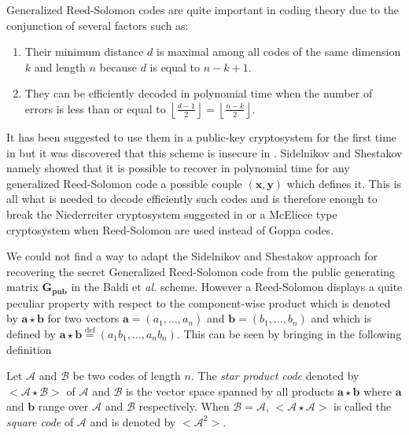 \documentclass[runningheads,11pt]{llncs}
\newcommand{\eqdef}{\stackrel{\text{def}}{=}}
\newcommand{\code}[1]{\ensuremath{\mathscr{#1}}}
\newcommand{\word}[1]{\ensuremath{\boldsymbol{#1}}}
\newcommand{\av}{\word{a}}
\newcommand{\bv}{\word{b}}
\newcommand{\xv}{\word{x}}
\newcommand{\yv}{\word{y}}
\newcommand{\mat}[1]{\ensuremath{\boldsymbol{#1}}}
\newcommand{\Gmp}{\mat{G_{pub}}}
\begin{document}
Generalized Reed-Solomon codes are quite important in coding theory
due to the conjunction of several factors such as:
\begin{enumerate}
\item Their minimum distance $d$ is maximal among all codes of the
  same dimension $k$ and length $n$  because $d$ is equal to $n-k+1$.
\item They can be efficiently decoded in polynomial time when the number of errors
is less than or equal to $\displaystyle \left \lfloor \frac{d-1}{2}
  \right \rfloor = \left \lfloor \frac{n-k}{2} \right \rfloor$. 
\end{enumerate}
It has been suggested to use them in a public-key cryptosystem for the first time in \cite{Niederreiter86} but 
it was discovered that this scheme is insecure in \cite{SidelShesta92}. Sidelnikov and Shestakov namely showed that it is 
possible  
to recover in polynomial time for any generalized Reed-Solomon code a possible couple $(\xv,\yv)$ which defines it.
This is all what is needed to decode efficiently such codes and is therefore enough to break the Niederreiter cryptosystem suggested in 
\cite{Niederreiter86} or a McEliece type cryptosystem \cite{McEliece78} when Reed-Solomon are used instead of Goppa codes.

We could not find a way to adapt the Sidelnikov and Shestakov approach 
for recovering the secret Generalized Reed-Solomon code from the public generating matrix $\Gmp$ in the 
Baldi et \textit{al.} scheme. 
However a Reed-Solomon displays a quite peculiar property with respect to the component-wise
product which is denoted by  $\av \star \bv $ for two vectors 
 $\av=(a_1, \dots, a_n)$ and $\bv=(b_1, \dots, b_n)$ and which is defined by
 $\av \star \bv \eqdef (a_1b_1,\dots{},a_n b_n)$. This can be seen by bringing in the following definition


\begin{definition}
Let $\code{A}$ and $\code{B}$ be two codes of length $n$. The
\emph{star product code} denoted by $<\code{A} \star \code{B}>$ of $\code{A}$ and $\code{B}$ is the vector space
spanned by all products $\av \star \bv$ where $\av$ and $\bv$ range over $\code{A}$ and $\code{B}$ respectively.
When $\code{B} = \code{A}$,  $<\code{A} \star \code{A}>$ is called the \emph{square code} of $\code{A}$
and is denoted by $<\code{A}^2>$.
\end{definition}
\end{document}
